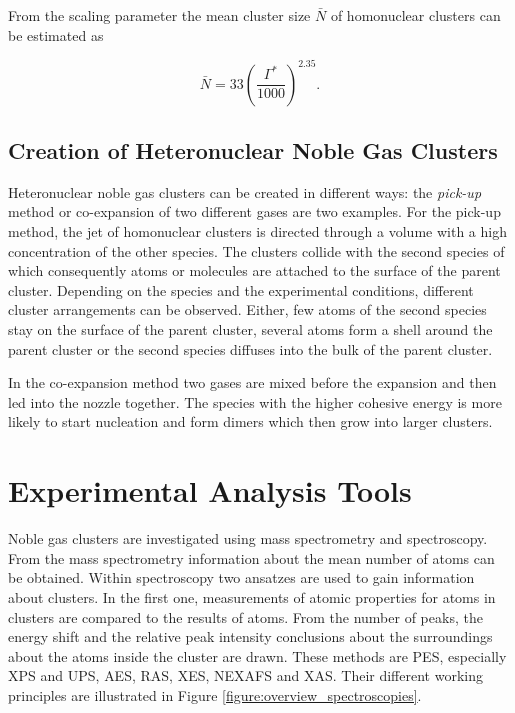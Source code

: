 From the scaling parameter the mean cluster size $\bar{N}$ 
of homonuclear clusters can be
estimated as

\begin{equation}
  \bar{N} = 33 \left( \frac{\Gamma^*}{1000} \right) ^{2.35} .
\end{equation}


\subsection{Creation of Heteronuclear Noble Gas Clusters}
Heteronuclear noble gas clusters can be created in different ways:
the \emph{pick-up} method or co-expansion of two different gases are two examples.
For the pick-up method, the jet of homonuclear clusters is directed through
a volume with a high concentration of the other species. The clusters
collide with the second species of which consequently atoms or molecules
are attached to the surface
of the parent cluster. Depending on the species
and the experimental conditions, different cluster arrangements can be observed.
Either, few atoms
of the second species stay on the surface of the parent cluster,
several atoms form a shell around the parent cluster or the second species
diffuses into the bulk of the parent cluster.

In the co-expansion method two gases are mixed before the expansion and
then led into the nozzle together. The species with the higher cohesive
energy is more likely to start nucleation and form dimers which
then grow into larger clusters.



\section{Experimental Analysis Tools}
Noble gas clusters are investigated using mass spectrometry and spectroscopy.
From the mass spectrometry information about the mean number of atoms
can be obtained. Within spectroscopy two ansatzes are used
to gain information about clusters. In the first one, measurements of
atomic properties for atoms in clusters are compared to the results of
atoms. From the number of peaks, the energy shift and the relative peak
intensity conclusions about the surroundings about the atoms inside
the cluster are drawn. These methods are \ac{PES}, especially \ac{XPS}
and \ac{UPS}, \ac{AES}, \ac{RAS}, \ac{XES}, \ac{NEXAFS} and \ac{XAS}.
Their different working principles are illustrated in Figure
\ref{figure:overview_spectroscopies}.

